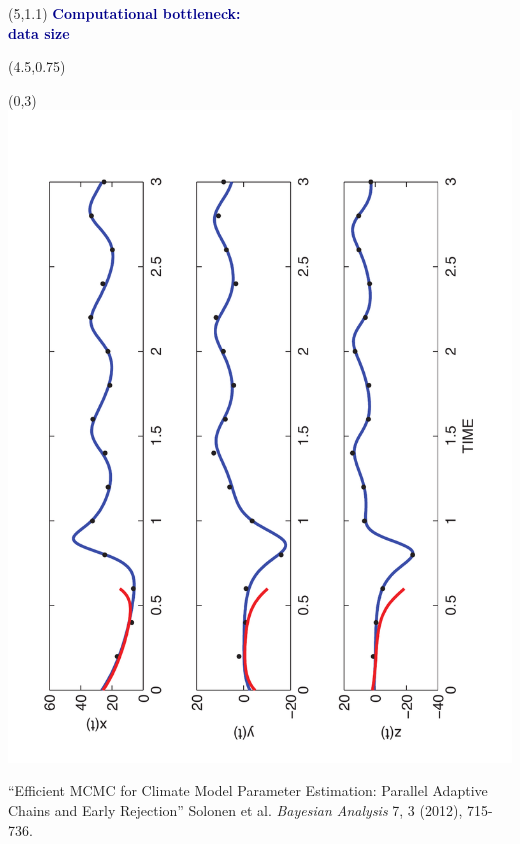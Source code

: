 \documentclass{article}
\renewcommand{\normalsize}  {\fontsize{14.4}{18}\selectfont}
\renewcommand{\Large}       {\fontsize{20.74}{25}\selectfont}
\newcommand{\VERYHuge}      {\fontsize{61.92}{77}\selectfont}
\begin{document}
\begin{textblock}{5}(5,1.1)\Large
\centering \textcolor{DarkBlue}{\textbf{Computational bottleneck:\\ data size\vspace{0.5in}}}  \vspace{0.1in}
\end{textblock}


\begin{textblock}{1}(4.5,0.75)
\centering {\VERYHuge vs.\vspace{1in}}\vspace{0.1in}
\end{textblock}

\begin{textblock}{5}(0,3)\Large\centering
\includegraphics[height=5.0\TPHorizModule,
  angle=-90]{images/solonen_fig.pdf}

\normalsize ``Efficient MCMC for Climate Model Parameter Estimation:
  Parallel Adaptive Chains and Early Rejection'' Solonen et al. \textit{Bayesian Analysis} 7, 3 (2012), 715-736.
\end{textblock}
\end{document}

